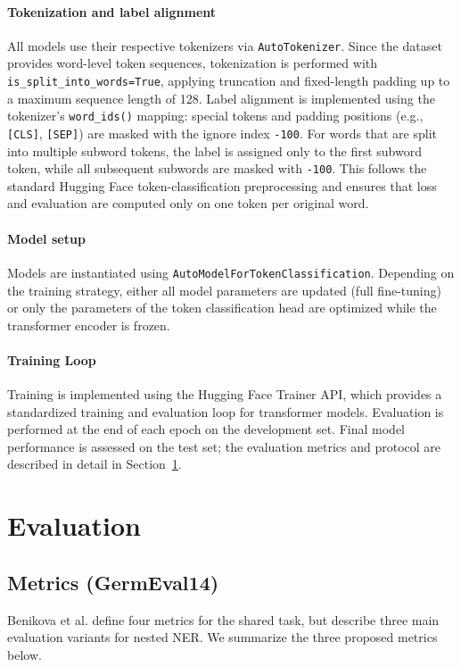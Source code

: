 \documentclass[11pt,a4paper,twocolumn]{article}
\begin{document}
\paragraph{Tokenization and label alignment}
All models use their respective tokenizers via \texttt{AutoTokenizer}. Since the dataset provides word-level token sequences, tokenization is performed with \texttt{is\_split\_into\_words=True}, applying truncation and fixed-length padding up to a maximum sequence length of 128. Label alignment is implemented using the tokenizer's \texttt{word\_ids()} mapping: special tokens and padding positions (e.g., \texttt{[CLS]}, \texttt{[SEP]}) are masked with the ignore index \texttt{-100}. For words that are split into multiple subword tokens, the label is assigned only to the first subword token, while all subsequent subwords are masked with \texttt{-100}. This follows the standard Hugging Face token-classification preprocessing and ensures that loss and evaluation are computed only on one token per original word. \cite{huggingface_token_classification}


\paragraph{Model setup}
Models are instantiated using \texttt{AutoModelForTokenClassification}. Depending on the training strategy, either all model parameters are updated (full fine-tuning) or only the parameters of the token classification head are optimized while the transformer encoder is frozen.

\paragraph{Training Loop}
Training is implemented using the Hugging Face Trainer API, which provides a standardized training and evaluation loop for transformer models. Evaluation is performed at the end of each epoch on the development set. Final model performance is assessed on the test set; the evaluation metrics and protocol are described in detail in Section~\ref{sec:evaluation}.

\section{Evaluation}
\label{sec:evaluation}

\subsection{Metrics (GermEval14)}
Benikova et al.\cite{benikova_germeval_nodate} define four metrics for the shared task, but describe three main evaluation variants for nested NER. We summarize the three proposed metrics below.
\end{document}

